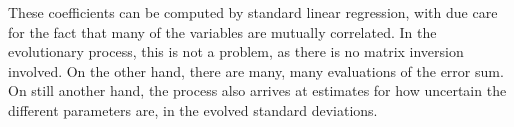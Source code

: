 \documentclass[11pt, oneside]{article}   	%
\begin{document}
These coefficients can be computed by standard linear regression, with due care for the fact that many of the variables are mutually correlated. In the evolutionary process, this is not a problem, as there is no matrix inversion involved. On the other hand, there are many, many evaluations of the error sum. On still another hand, the process also arrives at estimates for how uncertain the different parameters are, in the evolved standard deviations.
\end{document}
